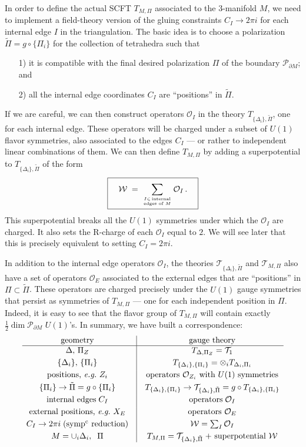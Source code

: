 \documentclass[hyper,letterpaper]{JHEP3}
\numberwithin{equation}{section}
\newcommand{\be}{\begin{equation}}
\newcommand{\ee}{\end{equation}}
\newcommand{\eg}{\emph{e.g.}}
\newcommand{\pd}{\partial}
\newcommand{\CO}{\mathcal{O}}
\newcommand{\CP}{\mathcal{P}}
\newcommand{\CT}{\mathcal{T}}
\newcommand{\CW}{\mathcal{W}}
\begin{document}
In order to define the actual SCFT $T_{M,\Pi}$ associated to the 3-manifold $M$, we need to implement a field-theory version of the gluing constraints $C_I\to 2\pi i$ for each internal edge $I$ in the triangulation. The basic idea is to choose a polarization $\tilde\Pi = g\circ\{\Pi_i\}$ for the collection of tetrahedra such that
%
\begin{itemize}
\item[1)] it is compatible with the final desired polarization $\Pi$ of the boundary $\CP_{\pd M}$; and
\item[2)] all the internal edge coordinates $C_I$ are ``positions'' in $\tilde\Pi$.
\end{itemize}
%
If we are careful, we can then construct operators $\CO_I$ in the theory $T_{\{\Delta_i\},\tilde\Pi}$, one for each internal edge. These operators will be charged under a subset of $U(1)$ flavor symmetries, also associated to the edges $C_I$ --- or rather to independent linear combinations of them. We can then define $T_{M,\Pi}$ by adding a superpotential to $T_{\{\Delta_i\},\tilde\Pi}$ of the form
%
\be
\boxed{\phantom{\int}
\CW \; = \; \sum_{{I \in \, \text{internal} \atop \text{edges of~} M}} \CO_I\,.
\phantom{\int}}
\label{WforTM}
\ee
%
This superpotential breaks all the $U(1)$ symmetries under which the $\CO_I$ are charged. It also sets the R-charge of each $\CO_I$ equal to $2$. We will see later that this is precisely equivalent to setting $C_I=2\pi i$.

In addition to the internal edge operators $\CO_I$, the theories $\CT_{\{\Delta_i\},\tilde\Pi}$ and $\CT_{M,\Pi}$ also have a set of operators $\CO_E$ associated to the external edges%
that are ``positions'' in $\Pi \subset \tilde\Pi$. These operators are charged precisely under the $U(1)$ gauge symmetries that persist as symmetries of $T_{M,\Pi}$ --- one for each independent position in $\Pi$. Indeed, it is easy to see that the flavor group of $T_{M,\Pi}$ will contain exactly $\frac12\dim \CP_{\pd M}$ $U(1)$'s. In summary, we have built a correspondence:
%
\be
\begin{array}{c@{\quad}|@{\quad}c}
\text{geometry} & \text{gauge theory} \\\hline
\Delta,\,\Pi_Z & T_{\Delta,\Pi_Z}= \CT_1 \\[.1cm]
\{\Delta_i\},\, \{\Pi_i\} & T_{\{\Delta_i\},\{\Pi_i\}}=\otimes_i T_{\Delta_i,\Pi_i} \\[.1cm]
\text{positions, \eg\ $Z_i$} & \text{operators $\CO_{Z_i}$ with $U(1)$ symmetries} \\[.1cm]
\{\Pi_i\} \to \tilde\Pi=g\circ \{\Pi_i\} & T_{\{\Delta_i\},\{\Pi_i\}}\to \CT_{\{\Delta_i\},\tilde\Pi}=  g\circ T_{\{\Delta_i\},\{\Pi_i\}} \\[.1cm]
\text{internal edges}\;C_I & \text{operators}\; \CO_I \\[.1cm]
\text{external positions, \eg\ $X_E$} & \text{operators $\CO_E$} \\[.1cm]
C_I \to 2\pi i \;\text{(symp$^\text{c}$ reduction)} & \CW = \sum_I \CO_I \\[.1cm]
M = \cup_i\Delta_i,\;\;\Pi  & T_{M,\Pi} = \CT_{\{\Delta_i\},\tilde\Pi}\;\text{+ superpotential $\CW$}
\end{array}
\ee
\bigskip
\end{document}
